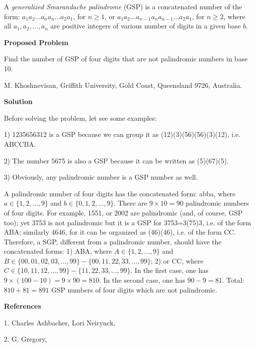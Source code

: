 \documentclass[12pt]{article}
\begin{document}
A \emph{generalized Smarandache palindrome} (GSP) is a concatenated number of the form: $a_{1}a_{2}\ldots a_{n}a_{n} \ldots a_{2}a_{1}$, for $n \geq 1$, or  $a_{1}a_{2} \ldots a_{n-1}a_{n}a_{n-1} \ldots a_{2}a_{1}$, for $n \geq 2$,  where all $a_1,a_2, \ldots ,a_n$ are positive integers of various number of digits in a given base $b$.  

\textbf{Proposed Problem}

Find the number of GSP of four digits that are not palindromic numbers in base 10.
 
M. Khoshnevisan, Griffith University, Gold Coast, Queensland 9726, Australia.


\textbf{Solution}

Before solving the problem, let see some examples:

1) 1235656312 is a GSP because we can group it as (12)(3)(56)(56)(3)(12), i.e. ABCCBA.

2) The number 5675 is also a GSP because it can be written as (5)(67)(5).

3) Obviously, any palindromic number is a GSP number as well.

A palindromic number of four digits has the concatenated form: abba, where $a \in \{1, 2, \ldots , 9\}$ and $b \in \{0, 1, 2, \ldots , 9\}$. There are $9 \times 10=90$ palindromic numbers of four digits. For example, 1551, or 2002 are palindromic (and, of course, GSP too); yet 3753 is not palindromic but it is a GSP for 3753=3(75)3, i.e. of the form ABA; similarly 4646, for it can be organized as (46)(46), i.e. of the form CC.  
Therefore, a SGP, different from a palindromic number, should have the concatenated forms: 
1) ABA, where $A \in \{1, 2, \ldots , 9\}$ and $B \in \{00, 01, 02, 03, \ldots , 99\} - \{00, 11, 22, 33, \ldots , 99\}$;
2) or CC, where $C \in \{10, 11, 12, \ldots , 99\} - \{ 11, 22, 33, \ldots , 99\}$.
In the first case, one has $9 \times (100-10)=9 \times 90=810$.  In the second case, one has $90-9=81$.
Total: $810+81=891$ GSP numbers of four digits which are not palindromic.

\textbf{References}

1. Charles Ashbacher, Lori Neirynck, 

2. G. Gregory, 
\end{document}
